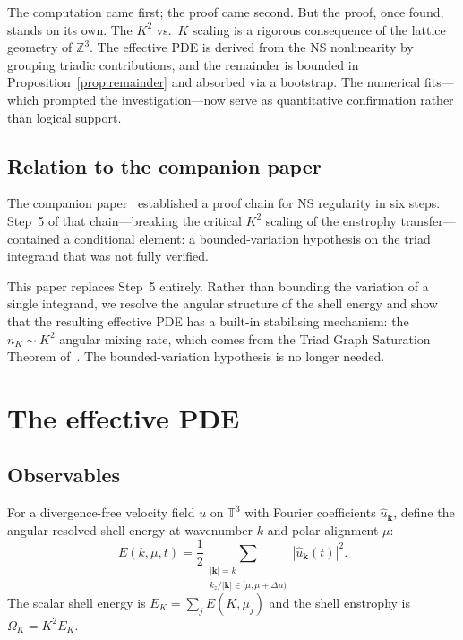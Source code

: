 \documentclass[11pt,a4paper]{article}
\theoremstyle{remark}
\newcommand{\Z}{\mathbb{Z}}
\newcommand{\T}{\mathbb{T}}
\begin{document}
The computation came first; the proof came second.  But the proof, once found, stands on its own.  The $K^2$ vs.\ $K$ scaling is a rigorous consequence of the lattice geometry of $\Z^3$.  The effective PDE is derived from the NS nonlinearity by grouping triadic contributions, and the remainder is bounded in Proposition~\ref{prop:remainder} and absorbed via a bootstrap.  The numerical fits---which prompted the investigation---now serve as quantitative confirmation rather than logical support.

\subsection{Relation to the companion paper}

The companion paper~\cite{higgins2026cascade} established a proof chain for NS regularity in six steps.  Step~5 of that chain---breaking the critical $K^2$ scaling of the enstrophy transfer---contained a conditional element: a bounded-variation hypothesis on the triad integrand that was not fully verified.

This paper replaces Step~5 entirely.  Rather than bounding the variation of a single integrand, we resolve the angular structure of the shell energy and show that the resulting effective PDE has a built-in stabilising mechanism: the $n_K \sim K^2$ angular mixing rate, which comes from the Triad Graph Saturation Theorem of~\cite{higgins2026cascade}.  The bounded-variation hypothesis is no longer needed.

\section{The effective PDE}\label{sec:effective-pde}

\subsection{Observables}

For a divergence-free velocity field $u$ on $\T^3$ with Fourier coefficients $\hat{u}_{\mathbf{k}}$, define the angular-resolved shell energy at wavenumber $k$ and polar alignment $\mu$:
\[
  E(k, \mu, t) = \frac{1}{2} \sum_{\substack{|\mathbf{k}| = k \\ k_z/|\mathbf{k}| \in [\mu, \mu+\Delta\mu)}} |\hat{u}_{\mathbf{k}}(t)|^2.
\]
The scalar shell energy is $E_K = \sum_j E(K, \mu_j)$ and the shell enstrophy is $\Omega_K = K^2 E_K$.
\end{document}
